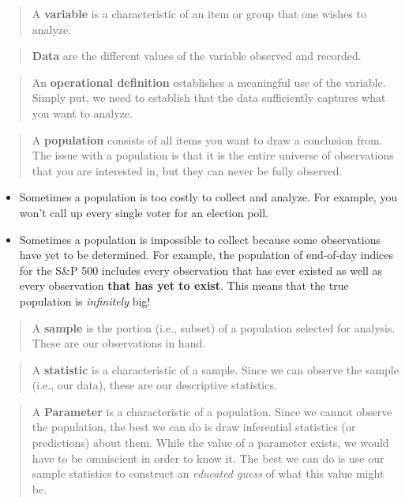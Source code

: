 \documentclass[
]{book}
\begin{document}
\begin{quote}
A \textbf{variable} is a characteristic of an item or group that one wishes to analyze.
\end{quote}

\begin{quote}
\textbf{Data} are the different values of the variable observed and recorded.
\end{quote}

\begin{quote}
An \textbf{operational definition} establishes a meaningful use of the variable. Simply put, we need to establish that the data sufficiently captures what you want to analyze.
\end{quote}

\begin{quote}
A \textbf{population} consists of all items you want to draw a conclusion from. The issue with a population is that it is the entire universe of observations that you are interested in, but they can never be fully observed.
\end{quote}

\begin{itemize}
\item
  Sometimes a population is too costly to collect and analyze. For example, you won't call up every single voter for an election poll.
\item
  Sometimes a population is impossible to collect because some observations have yet to be determined. For example, the population of end-of-day indices for the S\&P 500 includes every observation that has ever existed as well as every observation \textbf{that has yet to exist}. This means that the true population is \emph{infinitely} big!
\end{itemize}

\begin{quote}
A \textbf{sample} is the portion (i.e., subset) of a population selected for analysis. These are our observations in hand.
\end{quote}

\begin{quote}
A \textbf{statistic} is a characteristic of a sample. Since we can observe the sample (i.e., our data), these are our descriptive statistics.
\end{quote}

\begin{quote}
A \textbf{Parameter} is a characteristic of a population. Since we cannot observe the population, the best we can do is draw inferential statistics (or predictions) about them. While the value of a parameter exists, we would have to be omniscient in order to know it. The best we can do is use our sample statistics to construct an \emph{educated guess} of what this value might be.
\end{quote}
\end{document}
